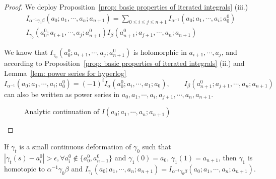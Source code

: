 \begin{proof}
We deploy Proposition~\ref{prop: basic properties of iterated integrals} (iii.)
\begin{multline}
I_{\alpha^{-1}\gamma_0\beta}(a_0;a_1,\cdots,a_n;a_{n+1})=\sum_{0\leq i\leq j\leq n+1}I_{\alpha^{-1}}(a_0;a_1,\cdots,a_i;a_0^0)\\
I_{\gamma_0}(a_0^0;a_{i+1},\cdots,a_j;a_{n+1}^0)I_{\beta}(a_{n+1}^0;a_{j+1},\cdots,a_n;a_{n+1})
\end{multline}

We know that $I_{\gamma_0}(a_0^0;a_{i+1},\cdots,a_j;a_{n+1}^0)$ is holomorphic in $a_{i+1},\cdots,a_j$, and according to Proposition~\ref{prop: basic properties of iterated integrals} (ii.) and Lemma~\ref{lem: power series for hyperlog}
\[
I_{\alpha^{-1}}(a_0;a_1,\cdots,a_i;a_0^0)=(-1)^iI_{\alpha}(a_0^0;a_i,\cdots,a_1;a_0),\qquad I_{\beta}(a_{n+1}^0;a_{j+1},\cdots,a_n;a_{n+1})
\]
can also be written as power series in $a_0,a_1,\cdots,a_i,a_{j+1},\cdots,a_n,a_{n+1}$.
\begin{figure}
\centering
{}
\caption{Analytic continuation of $I(a_0;a_1,\cdots,a_n;a_{n+1})$}
\label{fig: analytic continuation of iterated integrals}
\end{figure}
\end{proof}

\begin{remark}\label{rmk: gamma1 = gamma0 => same integral}
If $\gamma_t$ is a small continuous deformation of $\gamma_0$ such that $|\gamma_t(s)-a^0_i|>\epsilon,\forall a^0_i\notin\{a^0_0,a^0_{n+1}\}$ and $\gamma_1(0)=a_0$, $\gamma_1(1)=a_{n+1}$, then $\gamma_1$ is homotopic to $\alpha^{-1}\gamma_0\beta$ and $I_{\gamma_1}(a_0;a_1,\cdots,a_n;a_{n+1})=I_{\alpha^{-1}\gamma_0\beta}(a_0;a_1,\cdots,a_n;a_{n+1})$.
\end{remark}

